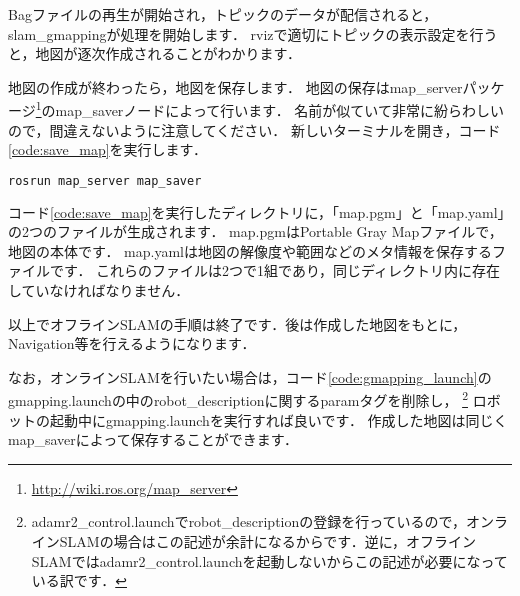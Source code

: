 \documentclass[{../../master}]{subfiles}
\begin{document}
Bagファイルの再生が開始され，トピックのデータが配信されると，\textsf{slam\_gmapping}が処理を開始します．
\textsf{rviz}で適切にトピックの表示設定を行うと，地図が逐次作成されることがわかります．

地図の作成が終わったら，地図を保存します．
地図の保存は\textsf{map\_server}パッケージ\footnote{\url{http://wiki.ros.org/map_server}}の\textsf{map\_saver}ノードによって行います．
名前が似ていて非常に紛らわしいので，間違えないように注意してください．
新しいターミナルを開き，コード\ref{code:save_map}を実行します．

\begin{lstlisting}[language=sh, label=code:save_map, caption=Save the Map]
rosrun map_server map_saver
\end{lstlisting}

コード\ref{code:save_map}を実行したディレクトリに，「\textsf{map.pgm}」と「\textsf{map.yaml}」の2つのファイルが生成されます．
\textsf{map.pgm}はPortable Gray Mapファイルで，地図の本体です．
\textsf{map.yaml}は地図の解像度や範囲などのメタ情報を保存するファイルです．
これらのファイルは2つで1組であり，同じディレクトリ内に存在していなければなりません．

以上でオフラインSLAMの手順は終了です．後は作成した地図をもとに，Navigation等を行えるようになります．

なお，オンラインSLAMを行いたい場合は，コード\ref{code:gmapping_launch}の\textsf{gmapping.launch}の中の\textsf{robot\_description}に関する\textsf{param}タグを削除し，
\footnote{\textsf{adamr2\_control.launch}で\textsf{robot\_description}の登録を行っているので，オンラインSLAMの場合はこの記述が余計になるからです．逆に，オフラインSLAMでは\textsf{adamr2\_control.launch}を起動しないからこの記述が必要になっている訳です．}
ロボットの起動中に\textsf{gmapping.launch}を実行すれば良いです．
作成した地図は同じく\textsf{map\_saver}によって保存することができます．
\end{document}
